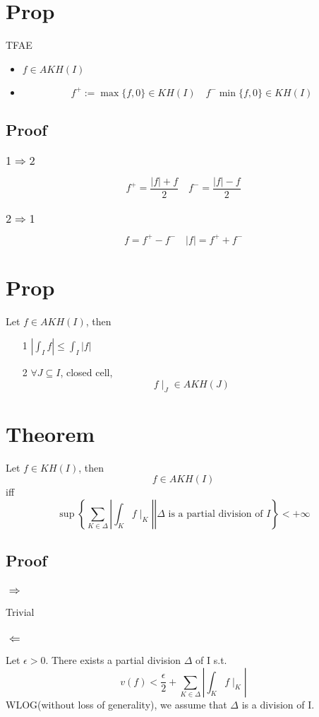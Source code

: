 \documentclass{book}
\newcommand{\abs}[1]{\left\lvert #1 \right\rvert}
\begin{document}
\section{Prop}TFAE
\begin{itemize}
    \item $f\in AKH(I)$
    \item $$f^+:=\max\{f,0\}\in KH(I)\quad f^-\min\{f,0\}\in KH(I)$$
\end{itemize}
\subsection*{Proof}
\subsubsection{$1\Rightarrow2$}
$$f^+=\frac{\abs f+f}2\quad f^-=\frac{\abs f-f}2$$
\subsubsection{$2\Rightarrow1$}
$$f=f^+-f^-\quad \abs f=f^++f^-$$
\section{Prop}Let $f\in AKH(I)$, then 
\begin{itemize}
    \item [1]$\abs{\int_If}\leq\int_I\abs f$
    \item [2]$\forall J\subseteq I$, closed cell, $$f\mid_J\in AKH(J)$$
\end{itemize}
\section{Theorem}
\label{Theorem KH derive AKH}
Let $f\in KH(I)$, then $$f\in AKH(I)$$
iff
$$\sup\left\{\left.\sum\limits_{K\in \Delta}\abs{\int_Kf\mid_K}\right|\Delta\text{ is a partial division of }I\right\}<+\infty$$
\subsection*{Proof}
\subsubsection{$\Rightarrow$}Trivial
\subsubsection{$\Leftarrow$}
Let $\epsilon>0$. There exists a partial division $\Delta$ of I s.t.
$$v(f)<\frac{\epsilon}2+\sum\limits_{K\in \Delta}\abs{\int_Kf\mid_K}$$
WLOG(without loss of generality), we assume that $\Delta$ is a division of I.
\end{document}
